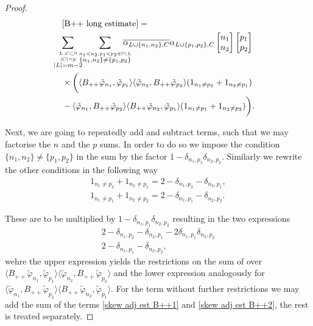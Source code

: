 \documentclass[b5paper,draft,openbib,12pt]{memoir}
\begin{document}
\begin{proof}
\begin{align}
  &\eqref{B++ long estimate} =\notag\\
  &\hspace{-0.4cm}\sum_{\overset{L,C\subset \mathbb{N}}{\overset{|C|=p}{|L|=m-2}}}\hspace{-0.2cm}\sum_{\overset{n_1<n_2,p_1<p_2\in\mathbb{N}\backslash L }{\{n_1,n_2\}\neq \{p_1,p_2\}}}
  \hspace{-0.4cm}\overline{\alpha_{L\cup\{n_1,n_2\},C}}\alpha_{L\cup\{p_1,p_2\},C}
\left[\begin{matrix}n_1\\n_2\end{matrix}\right]\left[\begin{matrix}p_1\\p_2\end{matrix}\right]\\
    &\times \bigg(
    \langle B_{++}\tilde{\varphi}_{n_1},\tilde{\varphi}_{p_1} \rangle \langle  \tilde{\varphi}_{n_2}, B_{++}\tilde{\varphi}_{p_2}\rangle (1_{n_1\neq p_2}+1_{n_2\neq p_1})\label{skew adj est B++1}\\
    &-\langle \tilde{\varphi}_{n_1},B_{++}\tilde{\varphi}_{p_2} \rangle \langle B_{++} \tilde{\varphi}_{n_2}, \tilde{\varphi}_{p_1}\rangle(1_{n_1\neq p_1}+1_{n_2\neq p_2})\bigg).\label{skew adj est B++2}
\end{align}

Next, we are going to repeatedly add and subtract terms, such that we may
factorise the \(n\) and the \(p\) sums. In order to do so we impose the 
condition \(\{n_1,n_2\}\neq \{p_1,p_2\}\) in the sum by the factor \(1-\delta_{n_1,p_1}\delta_{n_2,p_2}\). 
Similarly we rewrite the other conditions in the following way
\begin{align}
  1_{n_1\neq p_2}+1_{n_2\neq p_1}=2-\delta_{n_1,p_2}-\delta_{n_2,p_1},\\
  1_{n_1\neq p_1}+1_{n_2\neq p_2}=2-\delta_{n_1,p_1}-\delta_{n_2,p_2}.
\end{align}

These are to be multiplied by \(1-\delta_{n_1,p_1}\delta_{n_2,p_2}\)
resulting in the two expressions
\begin{align}\label{skew adj est cases 1}
  2-\delta_{n_1,p_2}-\delta_{n_2,p_1}-2 \delta_{n_1,p_1}\delta_{n_2,p_2}\\
  2-\delta_{n_1,p_1}-\delta_{n_2,p_2},
\end{align}
wehre the upper expression yields the restrictions on the sum of 
over \(\langle B_{++}\tilde{\varphi}_{n_1},\tilde{\varphi}_{p_1} \rangle \langle  \tilde{\varphi}_{n_2}, B_{++}\tilde{\varphi}_{p_2}\rangle\)
and the lower expression analogously for 
\(\langle \tilde{\varphi}_{n_1},B_{++}\tilde{\varphi}_{p_2} \rangle \langle B_{++} \tilde{\varphi}_{n_2}, \tilde{\varphi}_{p_1}\rangle\).
For the term without further restrictions we may add the sum of the 
terms \eqref{skew adj est B++1} and \eqref{skew adj est B++2}, the rest 
is treated separately.


\end{proof}
\end{document}
